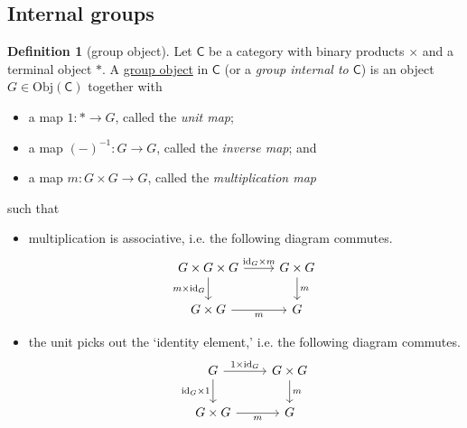 \documentclass[a4paper]{report}
\newcommand{\defn}[1]{\ul{#1}}
\newcommand{\Obj}{\mathrm{Obj}}
\theoremstyle{definition}
\newtheorem{definition}{Definition}[section]
\theoremstyle{plain}
\theoremstyle{remark}
\begin{document}
\subsection{Internal groups}
\begin{definition}[group object]
  \label{def:groupobject}
  Let $\mathsf{C}$ be a category with binary products $\times$ and a terminal object $*$. A \defn{group object} in $\mathsf{C}$ (or a \emph{group internal to $\mathsf{C}$}) is an object $G \in \Obj(\mathsf{C})$ together with 
  \begin{itemize}
    \item a map $1\colon * \to G$, called the \emph{unit map};

    \item a map $(-)^{-1}\colon G \to G$, called the \emph{inverse map}; and

    \item a map $m\colon G \times G \to G$, called the \emph{multiplication map}
  \end{itemize}
  such that 
  \begin{itemize}
    \item multiplication is associative, i.e. the following diagram commutes.
      \begin{equation*}
        \begin{tikzcd}
          G \times G \times G
          \arrow[r, "\mathrm{id}_{G} \times m"]
          \arrow[d, swap, "m \times \mathrm{id}_{G}"]
          & G \times G
          \arrow[d, "m"]
          \\
          G \times G
          \arrow[r, swap, "m"]
          & G
        \end{tikzcd}
      \end{equation*}

    \item the unit picks out the `identity element,' i.e. the following diagram commutes.
      \begin{equation*}
        \begin{tikzcd}
          G
          \arrow[r, "1 \times \mathrm{id}_{G}"]
          \arrow[d, swap, "\mathrm{id}_{G} \times 1"]
          & G \times G
          \arrow[d, "m"]
          \\
          G \times G
          \arrow[r, swap, "m"]
          & G
        \end{tikzcd}
      \end{equation*}


\end{itemize}
\end{definition}
\end{document}
